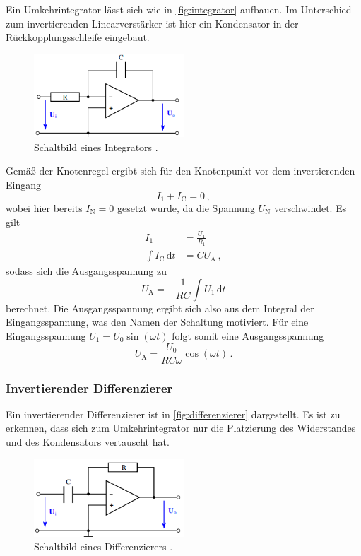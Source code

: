 \noindent
Ein Umkehrintegrator lässt sich wie in \autoref{fig:integrator} aufbauen. Im Unterschied zum invertierenden Linearverstärker ist hier ein Kondensator in der Rückkopplungsschleife eingebaut.

\begin{figure}
    \centering
    \includegraphics[width=0.5\textwidth]{integrator.png}
    \caption{Schaltbild eines Integrators \cite{ap51}.}
    \label{fig:integrator}
\end{figure}

\noindent
Gemäß der Knotenregel ergibt sich für den Knotenpunkt vor dem invertierenden Eingang 
\begin{equation*}
    I_1 + I_\text{C} = 0\, ,
\end{equation*}
wobei hier bereits $I_\text{N} = 0$ gesetzt wurde, da die Spannung $U_\text{N}$ verschwindet. Es gilt 
\begin{align*}
    I_1 &= \frac{U_1}{R_1} \\ 
    \int I_\text{C} \, \text{d}t &= C U_\text{A}\, ,
\end{align*}
sodass sich die Ausgangsspannung zu 
\begin{equation*}
    U_\text{A} = - \frac{1}{RC} \int U_1 \, \text{d}t
\end{equation*}
berechnet. Die Ausgangsspannung ergibt sich also aus dem Integral der Eingangsspannung, was den Namen der Schaltung motiviert. Für eine Eingangsspannung $U_1 = U_0 \sin(\omega t)$ folgt somit eine Ausgangsspannung 
\begin{equation}
    U_\text{A} = \frac{U_0}{RC\omega} \cos(\omega t)\, .
    \label{eqn:int}
\end{equation}

\subsubsection{Invertierender Differenzierer}

\noindent
Ein invertierender Differenzierer ist in \autoref{fig:differenzierer} dargestellt. Es ist zu erkennen, dass sich zum Umkehrintegrator nur die Platzierung des Widerstandes und des Kondensators vertauscht hat.
\begin{figure}
    \centering
    \includegraphics[width=0.5\textwidth]{differenzierer.png}
    \caption{Schaltbild eines Differenzierers \cite{ap51}.}
    \label{fig:differenzierer}
\end{figure}

